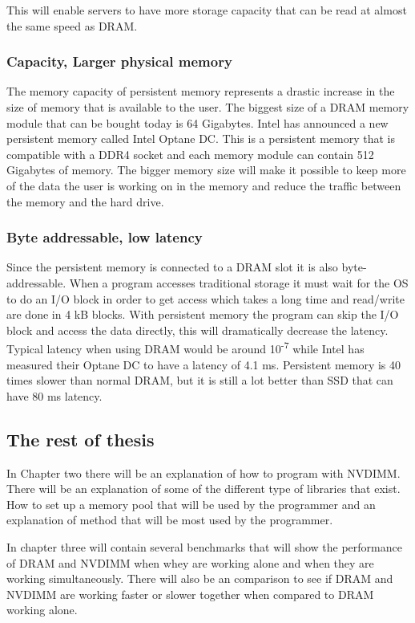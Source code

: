 \documentclass[12pt,a4paper,USenglish]{article}      %
\begin{document}
This will enable servers to have more storage capacity that can be read at almost the same speed as DRAM.

\subsubsection{Capacity, Larger physical memory}
The memory capacity of persistent memory represents a drastic increase in the size of memory that is available to the user. The biggest size of a DRAM memory module that can be bought today is 64 Gigabytes. Intel has announced a new persistent memory called Intel Optane DC\cite{side1}. This is a persistent memory that is compatible with a DDR4 socket and each memory module can contain 512 Gigabytes of memory. The bigger memory size will make it possible to keep more of the data the user is working on in the memory and reduce the traffic between the memory and the hard drive.

\subsubsection{Byte addressable, low latency}
Since the persistent memory is connected to a DRAM slot it is also byte-addressable. When a program accesses traditional storage it must wait for the OS to do an I/O block in order to get access which takes a long time and read/write are done in 4 kB blocks. With persistent memory the program can skip the I/O block and access the data directly, this will dramatically decrease the latency. Typical latency when using DRAM would be around 10\textsuperscript{-7}\cite{lerebok} while Intel has measured their Optane DC to have a latency of 4.1 ms\cite{optane2}. Persistent memory is 40 times slower than normal DRAM, but it is still a lot better than SSD that can have 80 ms latency.

\subsection{The rest of thesis}
In Chapter two there will be an explanation of how to program with NVDIMM. There will be an explanation of some of the different type of libraries that exist. How to set up a memory pool that will be used by the programmer and an explanation of method that will be most used by the programmer. 

In chapter three will contain several benchmarks that will show the performance of DRAM and NVDIMM when whey are working alone and when they are working simultaneously. There will also be an comparison to see if DRAM and NVDIMM are working faster or slower together when compared to DRAM working alone.
\end{document}
